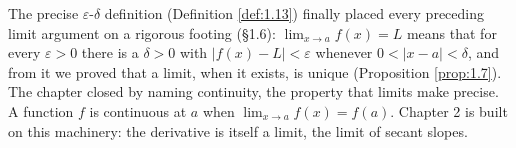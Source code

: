 \documentclass[a4paper,12pt,oneside]{memoir}
\begin{document}
The precise \(\varepsilon\)-\(\delta\) definition (Definition \ref{def:1.13}) finally placed every preceding limit argument on a rigorous footing (§1.6): \(\lim_{x \to a} f(x) = L\) means that for every \(\varepsilon > 0\) there is a \(\delta > 0\) with \(\lvert f(x) - L \rvert < \varepsilon\) whenever \(0 < \lvert x - a \rvert < \delta\), and from it we proved that a limit, when it exists, is unique (Proposition \ref{prop:1.7}). The chapter closed by naming continuity, the property that limits make precise. A function \(f\) is continuous at \(a\) when \(\lim_{x \to a} f(x) = f(a)\). Chapter 2 is built on this machinery: the derivative is itself a limit, the limit of secant slopes.
\end{document}
